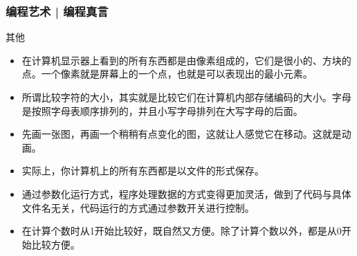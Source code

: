 \begin{frame}
  \frametitle{编程艺术 | 编程真言}
  \begin{block}{其他}
    \begin{itemize}
      \item 在计算机显示器上看到的所有东西都是由\alert{像素}组成的，它们是很小的、方块的点。一个像素就是屏幕上的一个点，也就是可以表现出的最小元素。
      \item 所谓\alert{比较字符的大小}，其实就是比较它们在计算机内部存储编码的大小。字母是按照字母表顺序排列的，并且小写字母排列在大写字母的后面。
      \item 先画一张图，再画一个稍稍有点变化的图，这就让人感觉它在移动。这就是\alert{动画}。
      \item 实际上，你计算机上的所有东西都是以文件的形式保存。
      \item 通过参数化运行方式，程序处理数据的方式变得更加灵活，做到了代码与具体文件名无关，代码运行的方式通过参数开关进行控制。
      \item 在计算个数时从1开始比较好，既自然又方便。除了计算个数以外，都是从0开始比较方便。
    \end{itemize}
  \end{block}
\end{frame}

